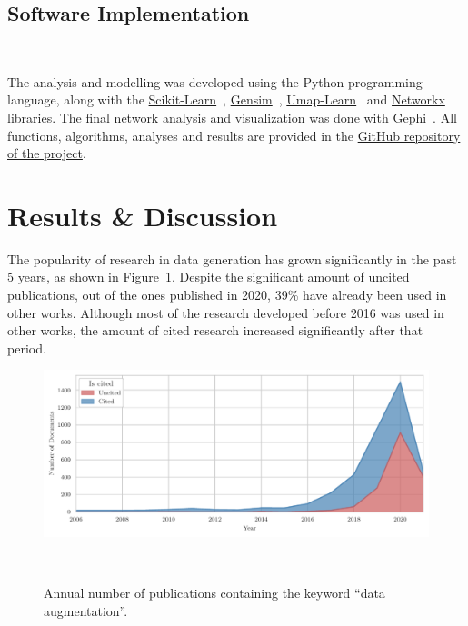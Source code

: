 \documentclass[parskip=full]{scrartcl}
\begin{document}
\subsection{Software Implementation}~\label{sec:software_implementation}

The analysis and modelling was developed using the Python programming
language, along with the
\href{https://scikit-learn.org/stable/}{Scikit-Learn}~\cite{Pedregosa2011},
\href{https://radimrehurek.com/gensim/}{Gensim}~\cite{Rehurek2010},
\href{https://github.com/lmcinnes/umap}{Umap-Learn}~\cite{Mcinnes2018} and
\href{https://networkx.org/}{Networkx}~\cite{Hagberg2008} libraries. The final
network analysis and visualization was done with
\href{https://gephi.org/}{Gephi}~\cite{Bastian2009}. All functions,
algorithms, analyses and results are provided in the
\href{https://github.com/joaopfonseca/research}{GitHub repository of the
project}.

\section{Results \& Discussion}

The popularity of research in data generation has grown significantly in the
past 5 years, as shown in Figure~\ref{fig:area_chart_cited_documents}. Despite
the significant amount of uncited publications, out of the ones published in
2020, 39\% have already been used in other works. Although most of the
research developed before 2016 was used in other works, the amount of cited
research increased significantly after that period.

\begin{figure}[H]
	\centering
    \includegraphics[width=\linewidth]{../analysis/area_chart_cited_documents}
    \caption{Annual number of publications containing the keyword ``data
        augmentation''.
    }~\label{fig:area_chart_cited_documents}
\end{figure}
\end{document}
